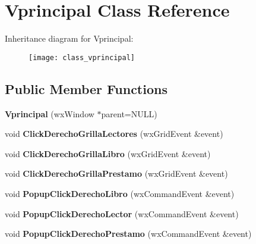 \hypertarget{class_vprincipal}{}\section{Vprincipal Class Reference}
\label{class_vprincipal}
Inheritance diagram for Vprincipal\+:\begin{figure}[H]
\begin{center}
\leavevmode
\texttt{[image: class\_vprincipal]}
\end{center}
\end{figure}
\subsection*{Public Member Functions}
\begin{DoxyCompactItemize}
\item 
{\bfseries Vprincipal} (wx\+Window $\ast$parent=N\+U\+LL)\hypertarget{class_vprincipal_a278dadba79f9ca00c8407757c95c5ded}{}\label{class_vprincipal_a278dadba79f9ca00c8407757c95c5ded}

\item 
void {\bfseries Click\+Derecho\+Grilla\+Lectores} (wx\+Grid\+Event \&event)\hypertarget{class_vprincipal_a5dcf202589d06db776164b52176a084d}{}\label{class_vprincipal_a5dcf202589d06db776164b52176a084d}

\item 
void {\bfseries Click\+Derecho\+Grilla\+Libro} (wx\+Grid\+Event \&event)\hypertarget{class_vprincipal_aa27cb1c5571e1087bc5d80f9d4c579a4}{}\label{class_vprincipal_aa27cb1c5571e1087bc5d80f9d4c579a4}

\item 
void {\bfseries Click\+Derecho\+Grilla\+Prestamo} (wx\+Grid\+Event \&event)\hypertarget{class_vprincipal_a4bdbd1ad546d5e0e998c12e435a4cf5e}{}\label{class_vprincipal_a4bdbd1ad546d5e0e998c12e435a4cf5e}

\item 
void {\bfseries Popup\+Click\+Derecho\+Libro} (wx\+Command\+Event \&event)\hypertarget{class_vprincipal_a69dec2b5b12821296eb0b58bc11e6a35}{}\label{class_vprincipal_a69dec2b5b12821296eb0b58bc11e6a35}

\item 
void {\bfseries Popup\+Click\+Derecho\+Lector} (wx\+Command\+Event \&event)\hypertarget{class_vprincipal_aac7b8ff710931e75a91ae506395298af}{}\label{class_vprincipal_aac7b8ff710931e75a91ae506395298af}

\item 
void {\bfseries Popup\+Click\+Derecho\+Prestamo} (wx\+Command\+Event \&event)\hypertarget{class_vprincipal_a13b970fdbe3fcb361b946ccf91904afc}{}\label{class_vprincipal_a13b970fdbe3fcb361b946ccf91904afc}


\end{DoxyCompactItemize}
